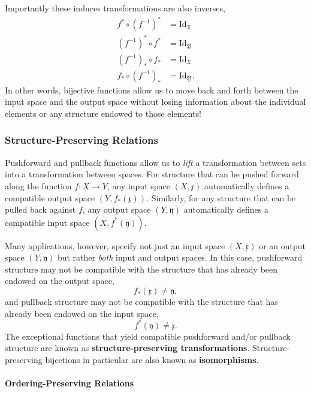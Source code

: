 \documentclass[
  letterpaper,
  DIV=11,
  numbers=noendperiod]{scrartcl}
\let\oldparagraph\paragraph
\renewcommand{\paragraph}[1]{\oldparagraph{#1}\mbox{}}
\begin{document}
Importantly these induces transformations are also inverses,
\begin{align*}
f^{*} \circ (f^{-1})^{*} &= \mathrm{Id}_{\mathfrak{X}}
\\
(f^{-1})^{*} \circ f^{*} &= \mathrm{Id}_{\mathfrak{Y}}
\\
(f^{-1})_{*} \circ f_{*} &= \mathrm{Id}_{\mathfrak{X}}
\\
f_{*} \circ (f^{-1})_{*} &= \mathrm{Id}_{\mathfrak{Y}}.
\end{align*} In other words, bijective functions allow us to move back
and forth between the input space and the output space without losing
information about the individual elements or any structure endowed to
those elements!

\subsubsection{Structure-Preserving
Relations}\label{structure-preserving-relations}

Pushforward and pullback functions allow us to \emph{lift} a
transformation between sets into a transformation between spaces. For
structure that can be pushed forward along the function
\(f : X \rightarrow Y\), any input space \((X, \mathfrak{x})\)
automatically defines a compatible output space
\((Y, f_{*}(\mathfrak{x}))\). Similarly, for any structure that can be
pulled back against \(f\), any output space \((Y, \mathfrak{y})\)
automatically defines a compatible input space
\((X, f^{*}(\mathfrak{y}))\).

Many applications, however, specify not just an input space
\((X, \mathfrak{x})\) or an output space \((Y, \mathfrak{y})\) but
rather \emph{both} input and output spaces. In this case, pushforward
structure may not be compatible with the structure that has already been
endowed on the output space, \[
f_{*}(\mathfrak{x}) \ne \mathfrak{y},
\] and pullback structure may not be compatible with the structure that
has already been endowed on the input space, \[
f^{*}(\mathfrak{y}) \ne \mathfrak{x}.
\] The exceptional functions that yield compatible pushforward and/or
pullback structure are known as \textbf{structure-preserving
transformations}. Structure-preserving bijections in particular are also
known as \textbf{isomorphisms}.

\paragraph{Ordering-Preserving
Relations}\label{ordering-preserving-relations}
\end{document}
